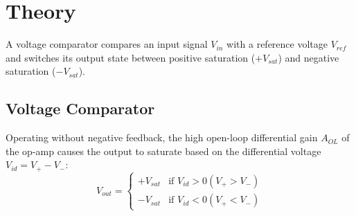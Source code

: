 %

\section{Theory}
A voltage comparator compares an input signal $V_{in}$ with a reference voltage $V_{ref}$ and switches its output state between positive saturation ($+V_{sat}$) and negative saturation ($-V_{sat}$).

\subsection{Voltage Comparator}
Operating without negative feedback, the high open-loop differential gain $A_{OL}$ of the op-amp causes the output to saturate based on the differential voltage $V_{id} = V_+ - V_-$:
\begin{equation}
	V_{out} = 
	\begin{cases} 
		+V_{sat} & \text{if } V_{id}>0 (V_+ > V_-) \\
		-V_{sat} & \text{if } V_{id}<0 (V_+ < V_-)
	\end{cases}
\end{equation}
